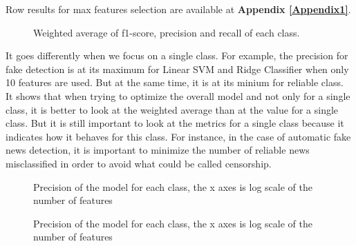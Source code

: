 Row results for max features selection are available at \textbf{Appendix \ref{Appendix1}}.
\begin{figure}[]
 \centering
 \caption{Weighted average of f1-score, precision and recall of each class. }
 \label{fig:chap3:max_feature3}
\end{figure}
It goes differently when we focus on a single class. For example, the precision for fake detection is at its maximum for Linear SVM and Ridge Classifier when only 10 features are used. But at the same time, it is at its minium for reliable class. It shows that when trying to optimize the overall model and not only for a single class, it is better to look at the weighted average than at the value for a single class. But it is still important to look at the metrics for a single class because it indicates how it behaves for this class. For instance, in the case of automatic fake news detection, it is important to minimize the number of reliable news misclassified in order to avoid what could be called censorship. 
\begin{figure}[]
 \centering
 \caption{Precision of the model for each class, the x axes is log scale of the number of features}
 \label{fig:chap3:max_feature1}
\end{figure}
\begin{figure}[]
 \centering
 \caption{Precision of the model for each class, the x axes is log scale of the number of features}
 \label{fig:chap3:max_feature2}
\end{figure}
